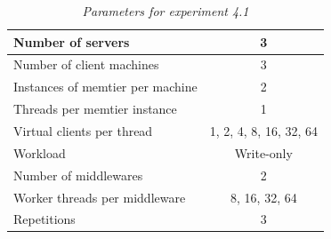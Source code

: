 \documentclass[11pt,a4paper]{article}
\begin{document}
	\begin{table}[H]
	\centering
		\begin{tabular}{|l|c|}
			\hline Number of servers                					& 3          \\ 
			\hline Number of client machines        			& 3          \\ 
			\hline Instances of memtier per machine 		& 2          \\ 
			\hline Threads per memtier instance    			& 1          \\
			\hline Virtual clients per thread       				& 1, 2, 4, 8, 16, 32, 64    \\ 
			\hline Workload                         						& Write-only \\
			\hline Number of middlewares            			& 2          \\
			\hline Worker threads per middleware    		& 8, 16, 32, 64    \\
			\hline Repetitions                      						& 3  \\ 
			\hline 
		\end{tabular}
		\caption{\textit{Parameters for experiment 4.1}}
		\label{Table:4_1_table}
	\end{table}


\end{document}
